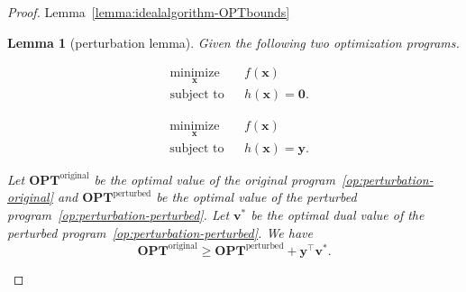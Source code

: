 \documentclass[11pt]{article}
\newtheorem{lemma}{Lemma}[section]
\theoremstyle{remark}
\theoremstyle{definition}
\newcommand{\by}{\mathbf{y}}
\newcommand{\bx}{\mathbf{x}}
\newcommand{\bv}{\mathbf{v}}
\newcommand{\OPT}{\mathbf{OPT}}
\begin{document}
\begin{proof}{Lemma~\ref{lemma:idealalgorithm-OPTbounds}}
	\begin{lemma}[perturbation lemma]
		Given the following two optimization programs.\\
		\begin{minipage}{\linewidth}
			\begin{minipage}{0.45\linewidth}
				\begin{equation}\label{op:perturbation-original}
				\begin{aligned}
				& \underset{\bx}{\text{minimize}}
				& & f(\bx) \\
				& \text{subject to}
				& & h(\bx)=\mathbf{0}.
				\end{aligned}
				\end{equation}
			\end{minipage}
			\begin{minipage}{0.45\linewidth}
				\begin{equation}\label{op:perturbation-perturbed}
				\begin{aligned}
				& \underset{\bx}{\text{minimize}}
				& & f(\bx) \\
				& \text{subject to}
				& & h(\bx)=\by.
				\end{aligned}
				\end{equation}
			\end{minipage}
		\end{minipage}
		Let $\OPT^{\text{original}}$ be the optimal value of the original program~\eqref{op:perturbation-original} and $\OPT^{\text{perturbed}}$ be the optimal value of the perturbed program~\eqref{op:perturbation-perturbed}. Let $\bv^*$ be the optimal dual value of the perturbed program~\eqref{op:perturbation-perturbed}. We have
		\begin{equation}
		\OPT^{\text{original}}\geq\OPT^{\text{perturbed}}+\by^\top\bv^*.
		\end{equation}
	\end{lemma}
	

\end{proof}
\end{document}
